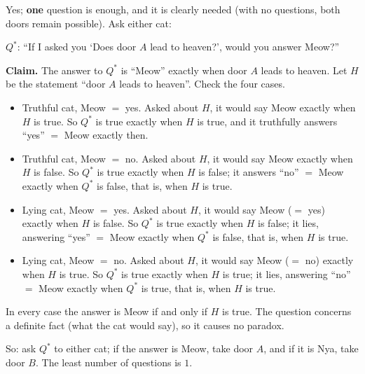 Yes; \textbf{one} question is enough, and it is clearly needed (with no questions, both doors remain possible). Ask either cat:
\begin{center}
$Q^*$: ``If I asked you `Does door $A$ lead to heaven?', would you answer Meow?''
\end{center}
\textbf{Claim.} The answer to $Q^*$ is ``Meow'' exactly when door $A$ leads to heaven. Let $H$ be the statement ``door $A$ leads to heaven''. Check the four cases.
\begin{itemize}
\item Truthful cat, Meow $=$ yes. Asked about $H$, it would say Meow exactly when $H$ is true. So $Q^*$ is true exactly when $H$ is true, and it truthfully answers ``yes'' $=$ Meow exactly then.
\item Truthful cat, Meow $=$ no. Asked about $H$, it would say Meow exactly when $H$ is false. So $Q^*$ is true exactly when $H$ is false; it answers ``no'' $=$ Meow exactly when $Q^*$ is false, that is, when $H$ is true.
\item Lying cat, Meow $=$ yes. Asked about $H$, it would say Meow ($=$ yes) exactly when $H$ is false. So $Q^*$ is true exactly when $H$ is false; it lies, answering ``yes'' $=$ Meow exactly when $Q^*$ is false, that is, when $H$ is true.
\item Lying cat, Meow $=$ no. Asked about $H$, it would say Meow ($=$ no) exactly when $H$ is true. So $Q^*$ is true exactly when $H$ is true; it lies, answering ``no'' $=$ Meow exactly when $Q^*$ is true, that is, when $H$ is true.
\end{itemize}
In every case the answer is Meow if and only if $H$ is true. The question concerns a definite fact (what the cat would say), so it causes no paradox.

So: ask $Q^*$ to either cat; if the answer is Meow, take door $A$, and if it is Nya, take door $B$. The least number of questions is $\boxed{1}$.
